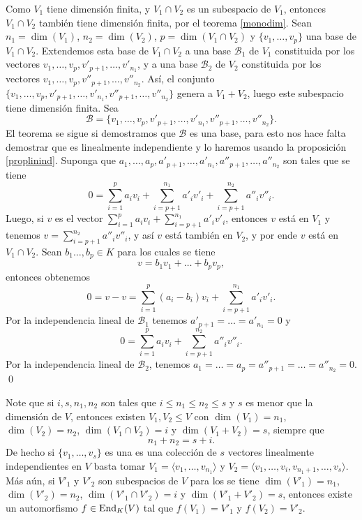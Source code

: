 \dem Como $V_1$ tiene dimensi\'on finita, y $V_1\cap V_2$ es un subespacio de $V_1$, entonces $V_1\cap V_2$ tambi\'en tiene dimensi\'on finita, por el teorema \ref{monodim}. Sean $n_1=\dim(V_1)$, $n_2=\dim(V_2)$, $p=\dim(V_1\cap V_2)$ y $\{v_1,\ldots,v_p\}$ una base de $V_1\cap V_2$. Extendemos esta base de $V_1\cap V_2$ a una base $\mathcal{B}_1$ de $V_1$ constituida por los vectores $v_1,\ldots,v_p,v'_{p+1},\ldots,v'_{n_1}$, y a una base $\mathcal{B}_2$ de $V_2$ constituida por los vectores $v_1,\ldots,v_p,v''_{p+1},\ldots,v''_{n_2}$. As\'i, el conjunto $\{v_1,\ldots,v_p,v'_{p+1},\ldots,v'_{n_1},v''_{p+1},\ldots,v''_{n_2}\}$ genera a $V_1+V_2$, luego este subespacio tiene dimensi\'on finita. Sea $$\mathcal{B}=\{v_1,\ldots,v_p,v'_{p+1},\ldots,v'_{n_1},v''_{p+1},\ldots,v''_{n_2}\}.$$ El teorema se sigue si demostramos que $\mathcal{B}$ es una base, para esto nos hace falta demostrar que es linealmente independiente y lo haremos usando la proposici\'on \ref{proplinind}. Suponga que $a_1,\ldots,a_p,a'_{p+1},\ldots,a'_{n_1},a''_{p+1},\ldots,a''_{n_2}$ son tales que se tiene
\[
0=\sum_{i=1}^p a_iv_i+\sum_{i=p+1}^{n_1}a'_iv'_i+\sum_{i=p+1}^{n_2} a''_iv''_i.
\]
Luego, si $v$ es el vector $\sum_{i=1}^p a_iv_i+\sum_{i=p+1}^{n_1}a'_iv'_i$, entonces $v$ est\'a en $V_1$ y tenemos $v=\sum_{i=p+1}^{n_2} a''_iv''_i$, y as\'i $v$ est\'a tambi\'en en $V_2$, y por ende $v$ est\'a en $V_1\cap V_2$. Sean $b_1\ldots,b_p\in K$ para los cuales se tiene
\[
v=b_1v_1+\ldots+b_pv_p,
\]
entonces obtenemos
\[
0=v-v=\sum_{i=1}^p (a_i-b_i)v_i+\sum_{i=p+1}^{n_1}a'_iv'_i.
\]
Por la independencia lineal de $\mathcal{B}_1$ tenemos $a'_{p+1}=\ldots=a'_{n_1}=0$ y
\[
0=\sum_{i=1}^p a_iv_i+\sum_{i=p+1}^{n_2} a''_iv''_i.
\]
Por la independencia lineal de $\mathcal{B}_2$, tenemos $a_1=\ldots=a_p=a''_{p+1}=\ldots=a''_{n_2}=0$. \qed

\begin{obs}
Note que si $i,s,n_1,n_2$ son tales que $i\le n_1\le n_2\le s$ y $s$ es menor que la dimensi\'on de $V$, entonces existen $V_1,V_2\le V$ con $\dim(V_1)=n_1$, $\dim(V_2)=n_2$, $\dim(V_1\cap V_2)=i$ y $\dim(V_1+V_2)=s$, siempre que
\[
n_1+n_2=s+i.
\]
De hecho si $\{v_1,\ldots,v_s\}$ es una es una colecci\'on de $s$ vectores linealmente independientes en $V$ basta tomar
$V_1=\langle v_1,\ldots,v_{n_1}\rangle$ y  $V_2=\langle v_1,\ldots,v_i,v_{n_1+1},\ldots,v_s\rangle$.
M\'as a\'un, si $V'_1$ y $V'_2$ son subespacios de $V$ para los se tiene $\dim(V'_1)=n_1$, $\dim(V'_2)=n_2$, $\dim(V'_1\cap V'_2)=i$ y $\dim(V'_1+V'_2)=s$, entonces existe un automorfismo $f\in\operatorname{End}_K(V)$ tal que $f(V_1)=V'_1$ y $f(V_2)=V'_2$.
\end{obs}

